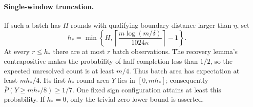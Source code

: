 \paragraph{Single-window truncation.}
If such a batch has $H$ rounds with qualifying boundary distance larger than
$\eta$, set
\[
 h_* =\min\left\{H,
 \left\lceil\frac{m\log(m/\delta)}{1024\kappa}\right\rceil-1\right\}.
\]
At every $r\le h_*$ there are at most $r$ batch observations. The recovery
lemma's contrapositive makes the probability of half-completion less than
$1/2$, so the expected unresolved count is at least $m/4$. Thus batch area
has expectation at least $mh_*/4$. Its first-$h_*$-round area $Y$ lies in
$[0,mh_*]$; consequently
$\overline P(Y\ge mh_*/8)\ge1/7$. One fixed sign configuration attains
at least this probability. If $h_*=0$, only the trivial zero lower bound is
asserted.
